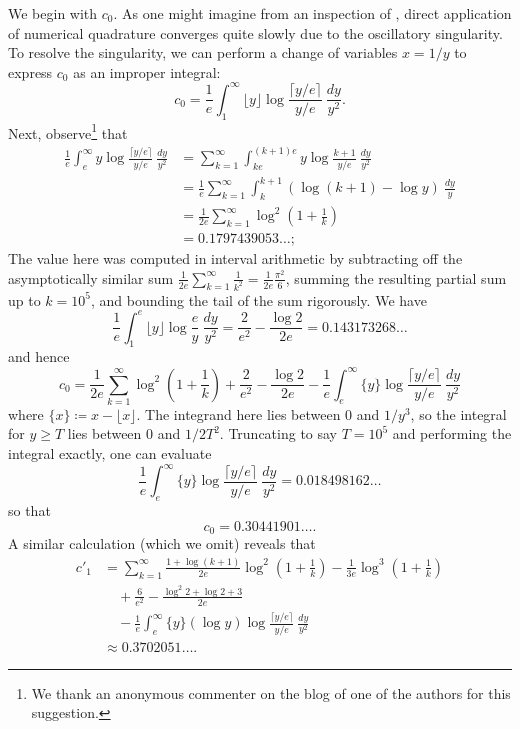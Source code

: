 \documentclass[10pt,a4paper,reqno]{amsart}
\numberwithin{equation}{section}
\theoremstyle{plain}
\theoremstyle{definition}
\begin{document}
We begin with $c_0$.  As one might imagine from an inspection of , direct application of numerical quadrature converges quite slowly due to the oscillatory singularity.  To resolve the singularity, we can perform a change of variables $x=1/y$ to express $c_0$ as an improper integral:
\begin{equation}\label{c0-alt}
   c_0 = \frac{1}{e} \int_1^\infty \lfloor y \rfloor \log \frac{\lceil y/e \rceil}{y/e}\ \frac{dy}{y^2}.
\end{equation}
Next, observe\footnote{We thank an anonymous commenter on the blog of one of the authors for this suggestion.} that
\begin{align*}
  \frac{1}{e} \int_e^\infty y \log \frac{\lceil y/e \rceil}{y/e}\ \frac{dy}{y^2}
  &= \sum_{k=1}^\infty \int_{ke}^{(k+1)e} y \log \frac{k+1}{y/e}\ \frac{dy}{y^2} \\
  &= \frac{1}{e} \sum_{k=1}^\infty \int_k^{k+1} \left(\log(k+1)-\log y\right)\ \frac{dy}{y}\\
  &= \frac{1}{2e} \sum_{k=1}^\infty \log^2 \left(1 + \frac{1}{k}\right)\\
  &= 0.1797439053\dots;
\end{align*}
The value here was computed in interval arithmetic by subtracting off the asymptotically similar sum $\frac{1}{2e} \sum_{k=1}^\infty \frac{1}{k^2} = \frac{1}{2e} \frac{\pi^2}{6}$, summing the resulting partial sum up to $k=10^5$, and bounding the tail of the sum rigorously. We have
$$ \frac{1}{e} \int_1^e \lfloor y \rfloor \log \frac{e}{y}\ \frac{dy}{y^2} = \frac{2}{e^2} - \frac{\log 2}{2e} = 0.143173268\dots$$
and hence
$$ c_0 = \frac{1}{2e} \sum_{k=1}^\infty \log^2 \left(1 + \frac{1}{k}\right)
+ \frac{2}{e^2} - \frac{\log 2}{2e} - \frac{1}{e} \int_e^\infty \{y\} \log \frac{\lceil y/e \rceil}{y/e}\ \frac{dy}{y^2}$$
where $\{x\} \coloneqq x - \lfloor x \rfloor$.  The integrand here lies between $0$ and $1/y^3$, so the integral for $y \geq T$ lies between $0$ and $1/2T^2$.  Truncating to say $T = 10^5$ and performing the integral exactly, one can evaluate
$$ \frac{1}{e} \int_e^\infty \{y\} \log \frac{\lceil y/e \rceil}{y/e}\ \frac{dy}{y^2} = 0.018498162\dots$$
so that
$$ c_0 = 0.30441901\dots.$$
A similar calculation (which we omit) reveals that
\begin{align*}
  c'_1 &= \sum_{k=1}^\infty \frac{1+\log(k+1)}{2e}  \log^2\left(1+\frac{1}{k}\right) - \frac{1}{3e} \log^3\left(1+\frac{1}{k}\right)  \\
  &\quad + \frac{6}{e^2} - \frac{\log^2 2 + \log 2 + 3}{2e}\\
 &\quad - \frac{1}{e} \int_e^\infty \{y\} (\log y) \log \frac{\lceil y/e \rceil}{y/e}\ \frac{dy}{y^2} \\
 &\approx 0.3702051\dots.
\end{align*}
\end{document}
